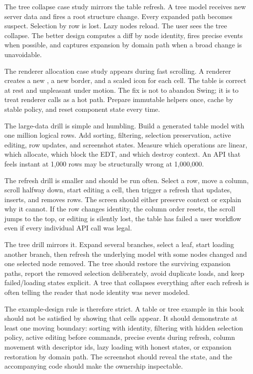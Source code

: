 The tree collapse case study mirrors the table refresh. A tree model receives new server data and fires a root structure change. Every expanded path becomes suspect. Selection by row is lost. Lazy nodes reload. The user sees the tree collapse. The better design computes a diff by node identity, fires precise events when possible, and captures expansion by domain path when a broad change is unavoidable.

The renderer allocation case study appears during fast scrolling. A renderer creates a new , a new border, and a scaled icon for each cell. The table is correct at rest and unpleasant under motion. The fix is not to abandon Swing; it is to treat renderer calls as a hot path. Prepare immutable helpers once, cache by stable policy, and reset component state every time.

The large-data drill is simple and humbling. Build a generated table model with one million logical rows. Add sorting, filtering, selection preservation, active editing, row updates, and screenshot states. Measure which operations are linear, which allocate, which block the EDT, and which destroy context. An API that feels instant at 1,000 rows may be structurally wrong at 1,000,000.

The refresh drill is smaller and should be run often. Select a row, move a column, scroll halfway down, start editing a cell, then trigger a refresh that updates, inserts, and removes rows. The screen should either preserve context or explain why it cannot. If the row changes identity, the column order resets, the scroll jumps to the top, or editing is silently lost, the table has failed a user workflow even if every individual API call was legal.

The tree drill mirrors it. Expand several branches, select a leaf, start loading another branch, then refresh the underlying model with some nodes changed and one selected node removed. The tree should restore the surviving expansion paths, report the removed selection deliberately, avoid duplicate loads, and keep failed/loading states explicit. A tree that collapses everything after each refresh is often telling the reader that node identity was never modeled.

The example-design rule is therefore strict. A table or tree example in this book should not be satisfied by showing that cells appear. It should demonstrate at least one moving boundary: sorting with identity, filtering with hidden selection policy, active editing before commands, precise events during refresh, column movement with descriptor ids, lazy loading with honest states, or expansion restoration by domain path. The screenshot should reveal the state, and the accompanying code should make the ownership inspectable.

